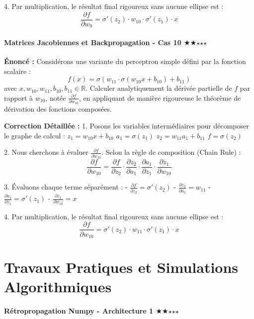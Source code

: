 \documentclass[11pt,a4paper]{article}
\begin{document}
4. Par multiplication, le résultat final rigoureux sans aucune ellipse est :
   $$ \frac{{\partial f}}{{\partial w_{9}}} = \sigma'(z_2) \cdot w_{10} \cdot \sigma'(z_1) \cdot x $$

\vspace{1cm}

\subsection*{Matrices Jacobiennes et Backpropagation - Cas 10 $\bigstar$$\bigstar$$\star$$\star$$\star$}

\textbf{Énoncé :}
Considérons une variante du perceptron simple défini par la fonction scalaire :
$$ f(x) = \sigma(w_{11} \cdot \sigma(w_{10} x + b_{10}) + b_{11}) $$
avec $x, w_{10}, w_{11}, b_{10}, b_{11} \in \mathbb{R}$.
Calculer analytiquement la dérivée partielle de $f$ par rapport à $w_{10}$, notée $\frac{{\partial f}}{{\partial w_{10}}}$, en appliquant de manière rigoureuse le théorème de dérivation des fonctions composées.

\textbf{Correction Détaillée :}
1. Posons les variables intermédiaires pour décomposer le graphe de calcul :
   $z_1 = w_{10} x + b_{10}$
   $a_1 = \sigma(z_1)$
   $z_2 = w_{11} a_1 + b_{11}$
   $f = \sigma(z_2)$

2. Nous cherchons à évaluer $\frac{{\partial f}}{{\partial w_{10}}}$. Selon la règle de composition (Chain Rule) :
   $$ \frac{{\partial f}}{{\partial w_{10}}} = \frac{{\partial f}}{{\partial z_2}} \cdot \frac{{\partial z_2}}{{\partial a_1}} \cdot \frac{{\partial a_1}}{{\partial z_1}} \cdot \frac{{\partial z_1}}{{\partial w_{10}}} $$

3. Évaluons chaque terme séparément :
   - $\frac{{\partial f}}{{\partial z_2}} = \sigma'(z_2)$
   - $\frac{{\partial z_2}}{{\partial a_1}} = w_{11}$
   - $\frac{{\partial a_1}}{{\partial z_1}} = \sigma'(z_1)$
   - $\frac{{\partial z_1}}{{\partial w_{10}}} = x$

4. Par multiplication, le résultat final rigoureux sans aucune ellipse est :
   $$ \frac{{\partial f}}{{\partial w_{10}}} = \sigma'(z_2) \cdot w_{11} \cdot \sigma'(z_1) \cdot x $$

\newpage
\part{Travaux Pratiques et Simulations Algorithmiques}
\subsection*{Rétropropagation Numpy - Architecture 1 $\bigstar$$\bigstar$$\star$$\star$$\star$}
\end{document}
